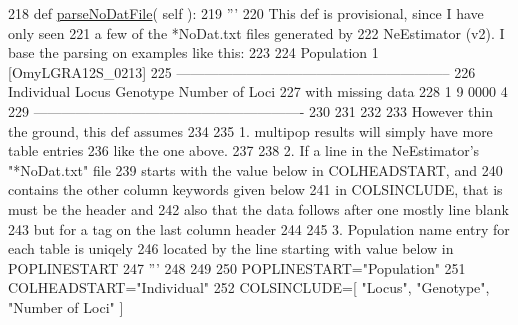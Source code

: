 \begin{DoxyCode}
218     \textcolor{keyword}{def }\hyperlink{classnegui_1_1pgoutputneestimator_1_1PGOutputNeEstimator_a4f8192c2aacf6e38b2c4c1d80302b643}{parseNoDatFile}( self ):
219         \textcolor{stringliteral}{'''}
220 \textcolor{stringliteral}{        This def is provisional, since I have only seen}
221 \textcolor{stringliteral}{        a few of the *NoDat.txt files generated by}
222 \textcolor{stringliteral}{        NeEstimator (v2). I base the parsing on examples like this:}
223 \textcolor{stringliteral}{}
224 \textcolor{stringliteral}{        Population 1 [OmyLGRA12S\_0213]  }
225 \textcolor{stringliteral}{        -----------------------------------------------------------}
226 \textcolor{stringliteral}{        Individual       Locus         Genotype     Number of Loci}
227 \textcolor{stringliteral}{                                          with missing data}
228 \textcolor{stringliteral}{               1            9             0000             4   }
229 \textcolor{stringliteral}{        ----------------------------------------------------------  }
230 \textcolor{stringliteral}{        }
231 \textcolor{stringliteral}{    }
232 \textcolor{stringliteral}{        }
233 \textcolor{stringliteral}{        However thin the ground, this def assumes}
234 \textcolor{stringliteral}{}
235 \textcolor{stringliteral}{        1. multipop results will simply have more table entries}
236 \textcolor{stringliteral}{        like the one above.}
237 \textcolor{stringliteral}{}
238 \textcolor{stringliteral}{        2. If a line in the NeEstimator's "*NoDat.txt" file}
239 \textcolor{stringliteral}{        starts with the value below in COLHEADSTART, and }
240 \textcolor{stringliteral}{        contains the other column keywords given below}
241 \textcolor{stringliteral}{        in COLSINCLUDE, that is must be the header and}
242 \textcolor{stringliteral}{        also that the data follows after one mostly line blank}
243 \textcolor{stringliteral}{        but for a tag on the last column header}
244 \textcolor{stringliteral}{}
245 \textcolor{stringliteral}{        3. Population name entry for each table is uniqely}
246 \textcolor{stringliteral}{        located by the line starting with value below in POPLINESTART}
247 \textcolor{stringliteral}{        '''}
248 
249 
250         POPLINESTART=\textcolor{stringliteral}{"Population"}
251         COLHEADSTART=\textcolor{stringliteral}{"Individual"}       
252         COLSINCLUDE=[ \textcolor{stringliteral}{"Locus"}, \textcolor{stringliteral}{"Genotype"}, \textcolor{stringliteral}{"Number of Loci"} ]

\end{DoxyCode}
